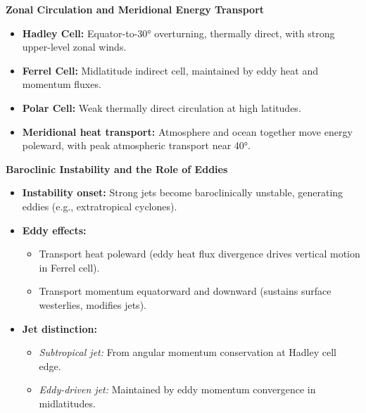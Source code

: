 \documentclass[fontsize=8pt, a4paper, landscape, fleqn]{scrartcl}
\renewcommand{\subsection}[1]{%
    \noindent\colorbox{subsectioncolor}{%
        \parbox{\dimexpr\columnwidth-2\fboxsep}{\color{white}\textbf{#1}}}%
    \vspace{0.5mm}%
}
\begin{document}
\begin{multicols*}{3}[\raggedcolumns]
\subsection{Zonal Circulation and Meridional Energy Transport}
\begin{itemize}
    \item \textbf{Hadley Cell:} Equator-to-30° overturning, thermally direct, with strong upper-level zonal winds.
    \item \textbf{Ferrel Cell:} Midlatitude indirect cell, maintained by eddy heat and momentum fluxes.
    \item \textbf{Polar Cell:} Weak thermally direct circulation at high latitudes.
    \item \textbf{Meridional heat transport:} Atmosphere and ocean together move energy poleward, with peak atmospheric transport near 40°.
\end{itemize}

\subsection{Baroclinic Instability and the Role of Eddies}
\begin{itemize}
    \item \textbf{Instability onset:} Strong jets become baroclinically unstable, generating eddies (e.g., extratropical cyclones).
    \item \textbf{Eddy effects:}
    \begin{itemize}
        \item Transport heat poleward (eddy heat flux divergence drives vertical motion in Ferrel cell).
        \item Transport momentum equatorward and downward (sustains surface westerlies, modifies jets).
    \end{itemize}
    \item \textbf{Jet distinction:}
    \begin{itemize}
        \item \textit{Subtropical jet:} From angular momentum conservation at Hadley cell edge.
        \item \textit{Eddy-driven jet:} Maintained by eddy momentum convergence in midlatitudes.
    \end{itemize}
\end{itemize}


\end{multicols*}
\end{document}

